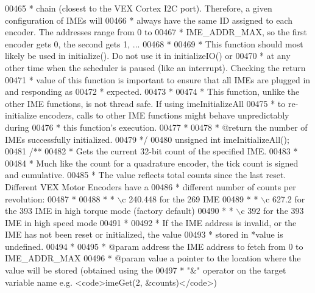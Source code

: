\begin{DoxyCode}
00465 \textcolor{comment}{ * chain (closest to the VEX Cortex I2C port). Therefore, a given configuration of IMEs will}
00466 \textcolor{comment}{ * always have the same ID assigned to each encoder. The addresses range from 0 to}
00467 \textcolor{comment}{ * IME\_ADDR\_MAX, so the first encoder gets 0, the second gets 1, ...}
00468 \textcolor{comment}{ *}
00469 \textcolor{comment}{ * This function should most likely be used in initialize(). Do not use it in initializeIO() or}
00470 \textcolor{comment}{ * at any other time when the scheduler is paused (like an interrupt). Checking the return}
00471 \textcolor{comment}{ * value of this function is important to ensure that all IMEs are plugged in and responding as}
00472 \textcolor{comment}{ * expected.}
00473 \textcolor{comment}{ *}
00474 \textcolor{comment}{ * This function, unlike the other IME functions, is not thread safe. If using imeInitializeAll}
00475 \textcolor{comment}{ * to re-initialize encoders, calls to other IME functions might behave unpredictably during}
00476 \textcolor{comment}{ * this function's execution.}
00477 \textcolor{comment}{ *}
00478 \textcolor{comment}{ * @return the number of IMEs successfully initialized.}
00479 \textcolor{comment}{ */}
00480 \textcolor{keywordtype}{unsigned} \textcolor{keywordtype}{int} imeInitializeAll();
00481 \textcolor{comment}{/**}
00482 \textcolor{comment}{ * Gets the current 32-bit count of the specified IME.}
00483 \textcolor{comment}{ *}
00484 \textcolor{comment}{ * Much like the count for a quadrature encoder, the tick count is signed and cumulative.}
00485 \textcolor{comment}{ * The value reflects total counts since the last reset. Different VEX Motor Encoders have a}
00486 \textcolor{comment}{ * different number of counts per revolution:}
00487 \textcolor{comment}{ *}
00488 \textcolor{comment}{ * * \(\backslash\)c 240.448 for the 269 IME}
00489 \textcolor{comment}{ * * \(\backslash\)c 627.2 for the 393 IME in high torque mode (factory default)}
00490 \textcolor{comment}{ * * \(\backslash\)c 392 for the 393 IME in high speed mode}
00491 \textcolor{comment}{ *}
00492 \textcolor{comment}{ * If the IME address is invalid, or the IME has not been reset or initialized, the value}
00493 \textcolor{comment}{ * stored in *value is undefined.}
00494 \textcolor{comment}{ *}
00495 \textcolor{comment}{ * @param address the IME address to fetch from 0 to IME\_ADDR\_MAX}
00496 \textcolor{comment}{ * @param value a pointer to the location where the value will be stored (obtained using the}
00497 \textcolor{comment}{ * "&" operator on the target variable name e.g. <code>imeGet(2, &counts)</code>)}

\end{DoxyCode}
